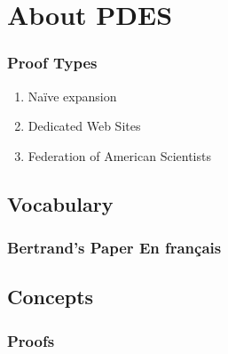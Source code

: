 % 

\section{About PDES}%
\begin{frame}\frametitle{Proof Types}
\begin{enumerate}
	\item Naïve expansion
	\item Dedicated Web Sites
	\item Federation of American Scientists
\end{enumerate}
\end{frame}


\subsection{Vocabulary}
\begin{frame}\frametitle{Bertrand's Paper En fran\c{c}ais}
\end{frame}


\subsection{Concepts}
\begin{frame}\frametitle{Proofs}
\end{frame}


\endinput  %

